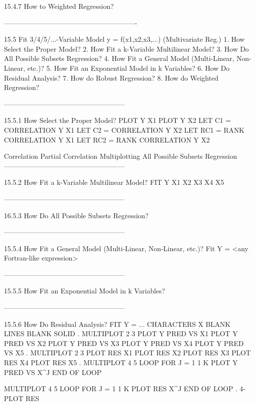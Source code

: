15.4.7
How to Weighted Regression?
 
----------------------------------------------------------
 
15.5
Fit 3/4/5/...-Variable Model y = f(x1,x2,x3,...) (Multivariate Reg.)
   1. How Select the Proper Model?
   2. How Fit a k-Variable Multilinear Model?
   3. How Do All Possible Subsets Regression?
   4. How Fit a General Model (Multi-Linear, Non-Linear, etc.)?
   5. How Fit an Exponential Model in k Variables?
   6. How Do Residual Analysis?
   7. How do Robust Regression?
   8. How do Weighted Regression?
 
-----------------------------------------------------
 
15.5.1
How Select the Proper Model?
      PLOT Y X1
      PLOT Y X2
      LET C1 = CORRELATION Y X1
      LET C2 = CORRELATION Y X2
      LET RC1 = RANK CORRELATION Y X1
      LET RC2 = RANK CORRELATION Y X2
 
   Correlation
   Partial Correlation
   Multiplotting
   All Possible Subsets Regression
-----------------------------------------------------
 
15.5.2
How Fit a k-Variable Multilinear Model?
      FIT Y X1 X2 X3 X4 X5
 
-----------------------------------------------------
 
16.5.3
How Do All Possible Subsets Regression?
 
-----------------------------------------------------
 
15.5.4
How Fit a General Model (Multi-Linear, Non-Linear, etc.)?
      Fit Y = <any Fortran-like expression>
 
-----------------------------------------------------
 
15.5.5
How Fit an Exponential Model in k Variables?
 
-----------------------------------------------------
 
15.5.6
How Do Residual Analysis?
      FIT Y = ...
      CHARACTERS X BLANK
      LINES BLANK SOLID
.
      MULTIPLOT 2 3
      PLOT Y PRED VS X1
      PLOT Y PRED VS X2
      PLOT Y PRED VS X3
      PLOT Y PRED VS X4
      PLOT Y PRED VS X5
.
      MULTIPLOT 2 3
      PLOT RES X1
      PLOT RES X2
      PLOT RES X3
      PLOT RES X4
      PLOT RES X5
.
      MULTIPLOT 4 5
      LOOP FOR J = 1 1 K
      PLOT Y PRED VS X^J
      END OF LOOP
 
      MULTIPLOT 4 5
      LOOP FOR J = 1 1 K
      PLOT RES X^J
      END OF LOOP
.
      4-PLOT RES
 
